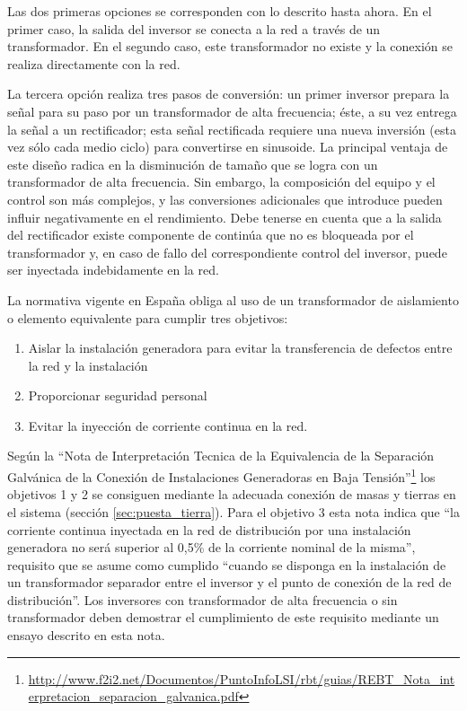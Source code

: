 Las dos primeras opciones se corresponden con lo descrito hasta ahora.
En el primer caso, la salida del inversor se conecta a la red a través
de un transformador. En el segundo caso, este transformador no existe
y la conexión se realiza directamente con la red. 

La tercera opción realiza tres pasos de conversión: un primer inversor
prepara la señal para su paso por un transformador de alta frecuencia;
éste, a su vez entrega la señal a un rectificador; esta señal rectificada
requiere una nueva inversión (esta vez sólo cada medio ciclo) para
convertirse en sinusoide. La principal ventaja de este diseño radica
en la disminución de tamaño que se logra con un transformador de alta
frecuencia. Sin embargo, la composición del equipo y el control son
más complejos, y las conversiones adicionales que introduce pueden
influir negativamente en el rendimiento. Debe tenerse en cuenta que
a la salida del rectificador existe componente de continúa que no
es bloqueada por el transformador y, en caso de fallo del correspondiente
control del inversor, puede ser inyectada indebidamente en la red.


La normativa vigente en España obliga al uso de un transformador de
aislamiento o elemento equivalente para cumplir tres objetivos:
\begin{enumerate}
\item Aislar la instalación generadora para evitar la transferencia de
  defectos entre la red y la instalación
\item Proporcionar seguridad personal
\item Evitar la inyección de corriente continua en la red.
\end{enumerate}

Según la ``Nota de Interpretación Tecnica de la Equivalencia de la
Separación Galvánica de la Conexión de Instalaciones Generadoras en
Baja
Tensión''\footnote{\url{http://www.f2i2.net/Documentos/PuntoInfoLSI/rbt/guias/REBT_Nota_interpretacion_separacion_galvanica.pdf}}
los objetivos 1 y 2 se consiguen mediante la adecuada conexión de masas
y tierras en el sistema (sección \ref{sec:puesta_tierra}). Para el
objetivo 3 esta nota indica que ``la corriente continua inyectada en
la red de distribución por una instalación generadora no será superior
al 0,5\% de la corriente nominal de la misma'', requisito que se asume
como cumplido ``cuando se disponga en la instalación de un
transformador separador entre el inversor y el punto de conexión de la
red de distribución''. Los inversores con transformador de alta
frecuencia o sin transformador deben demostrar el cumplimiento de este
requisito mediante un ensayo descrito en esta nota.

